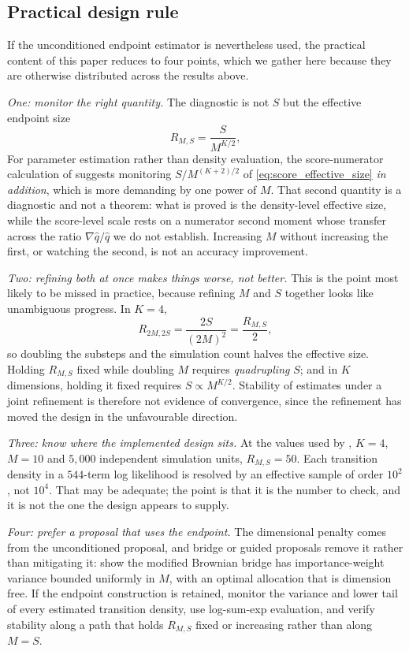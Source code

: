 \documentclass[11pt]{article}
\theoremstyle{definition}
\begin{document}
\subsection{Practical design rule}

If the unconditioned endpoint estimator is nevertheless used, the practical content of this paper reduces to four points, which we gather here because they are otherwise distributed across the results above.

\emph{One: monitor the right quantity.} The diagnostic is not $S$ but the effective endpoint size
\[
R_{M,S}=\frac{S}{M^{K/2}},
\]
For parameter estimation rather than density evaluation, the score-numerator calculation of  suggests monitoring $S/M^{(K+2)/2}$ of \eqref{eq:score_effective_size} \emph{in addition}, which is more demanding by one power of $M$. That second quantity is a diagnostic and not a theorem: what is proved is the density-level effective size, while the score-level scale rests on a numerator second moment whose transfer across the ratio $\nabla\widehat q/\widehat q$ we do not establish. Increasing $M$ without increasing the first, or watching the second, is not an accuracy improvement.

\emph{Two: refining both at once makes things worse, not better.} This is the point most likely to be missed in practice, because refining $M$ and $S$ together looks like unambiguous progress. In $K=4$,
\begin{equation}\label{eq:doubling_halves}
R_{2M,2S}=\frac{2S}{(2M)^2}=\frac{R_{M,S}}{2},
\end{equation}
so doubling the substeps and the simulation count halves the effective size. Holding $R_{M,S}$ fixed while doubling $M$ requires \emph{quadrupling} $S$; and in $K$ dimensions, holding it fixed requires $S\propto M^{K/2}$. Stability of estimates under a joint refinement is therefore not evidence of convergence, since the refinement has moved the design in the unfavourable direction.

\emph{Three: know where the implemented design sits.} At the values used by \citet{BrandtSantaClara2002}, $K=4$, $M=10$ and $5{,}000$ independent simulation units, $R_{M,S}=50$. Each transition density in a $544$-term log likelihood is resolved by an effective sample of order $10^2$, not $10^4$. That may be adequate; the point is that it is the number to check, and it is not the one the design appears to supply.

\emph{Four: prefer a proposal that uses the endpoint.} The dimensional penalty comes from the unconditioned proposal, and bridge or guided proposals remove it rather than mitigating it: \citet{StramerYan2007a} show the modified Brownian bridge has importance-weight variance bounded uniformly in $M$, with an optimal allocation that is dimension free. If the endpoint construction is retained, monitor the variance and lower tail of every estimated transition density, use log-sum-exp evaluation, and verify stability along a path that holds $R_{M,S}$ fixed or increasing rather than along $M=S$.
\end{document}
